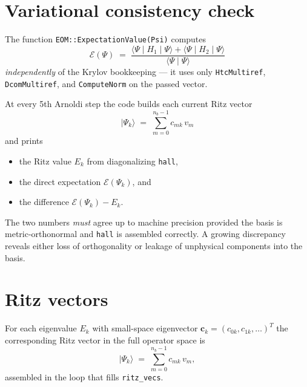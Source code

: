 \documentclass[11pt]{article}
\begin{document}
\section{Variational consistency check}

The function \texttt{EOM::ExpectationValue(Psi)} computes
\begin{equation}
  \mathcal{E}(\Psi)
  \;=\;
  \frac{\langle\Psi \mid H_1 \mid \Psi\rangle
       + \langle\Psi \mid H_2 \mid \Psi\rangle}
       {\langle\Psi \mid \Psi\rangle}
\end{equation}
\emph{independently} of the Krylov bookkeeping --- it uses only
\texttt{HtcMultiref}, \texttt{DcomMultiref}, and
\texttt{ComputeNorm} on the passed vector.

At every 5th Arnoldi step the code builds each current Ritz vector
\begin{equation}
  |\Psi_k\rangle \;=\; \sum_{m=0}^{n_b-1} c_{mk}\, v_m
\end{equation}
and prints
\begin{itemize}
  \item the Ritz value $E_k$ from diagonalizing \texttt{hall},
  \item the direct expectation $\mathcal{E}(\Psi_k)$, and
  \item the difference $\mathcal{E}(\Psi_k) - E_k$.
\end{itemize}
The two numbers \emph{must} agree up to machine precision provided the
basis is metric-orthonormal and \texttt{hall} is assembled correctly.
A growing discrepancy reveals either loss of orthogonality or leakage
of unphysical components into the basis.

\section{Ritz vectors}

For each eigenvalue $E_k$ with small-space eigenvector
$\mathbf{c}_k = (c_{0k}, c_{1k}, \dots)^T$ the corresponding Ritz
vector in the full operator space is
\begin{equation}
  |\Psi_k\rangle \;=\; \sum_{m=0}^{n_b-1} c_{mk}\, v_m,
\end{equation}
assembled in the loop that fills \texttt{ritz\_vecs}.
\end{document}
